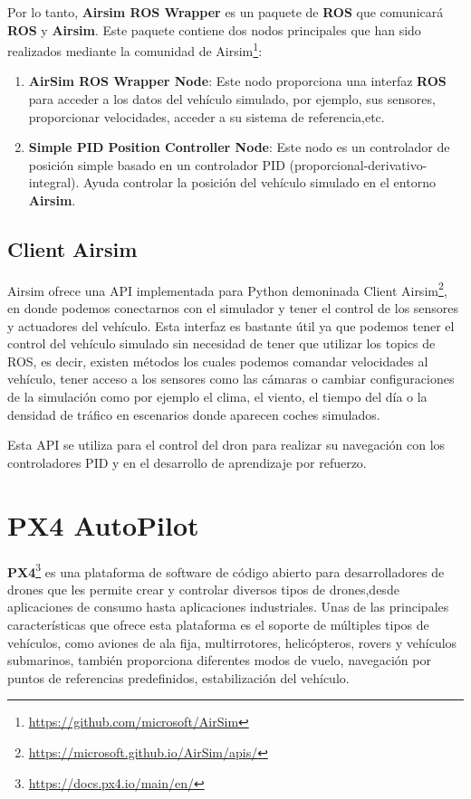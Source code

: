 Por lo tanto, \textbf{Airsim ROS Wrapper} es un paquete de \textbf{ROS} que comunicará \textbf{ROS} y \textbf{Airsim}. Este paquete contiene dos nodos principales 
que han sido realizados mediante la comunidad de Airsim\footnote{\url{https://github.com/microsoft/AirSim}}:
\begin{enumerate}
  \item \textbf{AirSim ROS Wrapper Node}: Este nodo proporciona una interfaz \textbf{ROS} para acceder a los datos del vehículo simulado, por ejemplo, sus sensores, proporcionar velocidades, acceder a su sistema de referencia,etc. 
  \item \textbf{Simple PID Position Controller Node}: Este nodo es un controlador de posición simple basado en un controlador PID (proporcional-derivativo-integral). Ayuda controlar la posición del vehículo 
  simulado en el entorno \textbf{Airsim}.
\end{enumerate}

\subsection{Client Airsim}
\label{sec:Client Airsim}

Airsim ofrece una API implementada para Python demoninada Client Airsim\footnote{\url{https://microsoft.github.io/AirSim/apis/}}, en donde podemos conectarnos con el simulador y tener el control de los sensores y actuadores del vehículo. 
Esta interfaz es bastante útil ya que podemos tener el control del vehículo simulado sin necesidad de tener que utilizar los topics de ROS, es decir, existen métodos los cuales
podemos comandar velocidades al vehículo, tener acceso a los sensores como las cámaras o cambiar configuraciones de la simulación como por ejemplo el clima, el viento, el tiempo del día
o la densidad de tráfico en escenarios donde aparecen coches simulados. \newline

Esta API se utiliza para el control del dron para realizar su navegación con los controladores PID y en 
el desarrollo de aprendizaje por refuerzo. 

\section{PX4 AutoPilot}
\label{sec:px4}

\textbf{PX4}\footnote{\url{https://docs.px4.io/main/en/}} es una plataforma de software de código abierto para desarrolladores de drones que les permite crear 
y controlar diversos tipos de drones,desde aplicaciones de consumo hasta aplicaciones industriales.
Unas de las principales características que ofrece esta plataforma es el soporte de múltiples tipos de vehículos, como aviones de 
ala fija, multirrotores, helicópteros, rovers y vehículos submarinos, también proporciona diferentes modos de vuelo, 
navegación por puntos de referencias predefinidos, estabilización del vehículo. \newline

